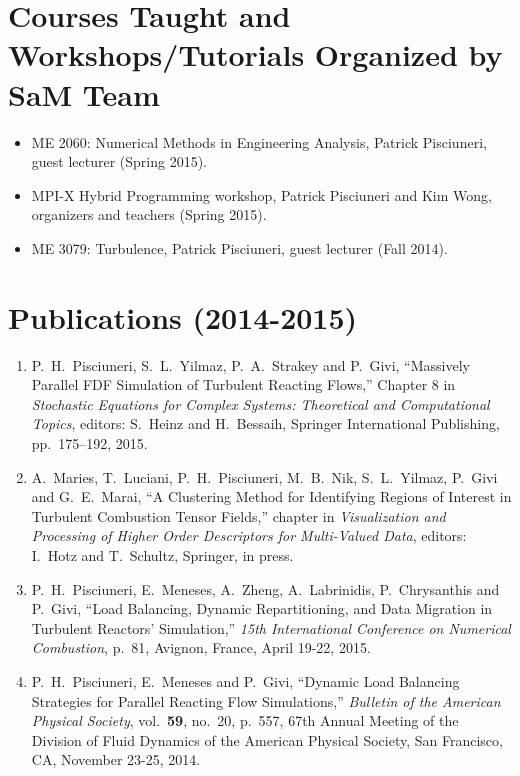 \documentclass{article}
\begin{document}
\section*{Courses Taught and Workshops/Tutorials Organized by SaM Team}
\begin{itemize}
\item ME 2060: Numerical Methods in Engineering Analysis, Patrick Pisciuneri, guest lecturer (Spring 2015).
\item MPI-X Hybrid Programming workshop, Patrick Pisciuneri and Kim Wong, organizers and teachers (Spring 2015).
\item ME 3079: Turbulence, Patrick Pisciuneri, guest lecturer (Fall 2014).
\end{itemize}
\section*{Publications (2014-2015)}
\begin{enumerate}
\item P.\ H.\ Pisciuneri, S.\ L.\ Yilmaz, P.\ A.\ Strakey and P.\ Givi, ``Massively Parallel FDF Simulation of Turbulent Reacting Flows,'' Chapter 8 in \textit{Stochastic Equations for Complex Systems: Theoretical and Computational Topics}, editors: S.\ Heinz and H.\ Bessaih, Springer International Publishing, pp.\ 175--192, 2015.
\item A.\ Maries, T.\ Luciani, P.\ H.\ Pisciuneri, M.\ B.\ Nik, S.\ L.\ Yilmaz, P.\ Givi and G.\ E.\ Marai, ``A Clustering Method for Identifying Regions of Interest in Turbulent Combustion Tensor Fields,'' chapter in \textit{Visualization and Processing of Higher Order Descriptors for Multi-Valued Data}, editors: I.\ Hotz and T.\ Schultz, Springer, in press.
\item P.\ H.\ Pisciuneri, E.\ Meneses, A.\ Zheng, A.\ Labrinidis, P.\ Chrysanthis and P.\ Givi, ``Load Balancing, Dynamic Repartitioning, and Data Migration in Turbulent Reactors' Simulation,'' \textit{15th International Conference on Numerical Combustion}, p.\ 81, Avignon, France, April 19-22, 2015.
\item P.\ H.\ Pisciuneri, E.\ Meneses and P.\ Givi, ``Dynamic Load Balancing Strategies for Parallel Reacting Flow Simulations,'' \textit{Bulletin of the American Physical Society}, vol.\ \textbf{59}, no.\ 20, p.\ 557, 67th Annual Meeting of the Division of Fluid Dynamics of the American Physical Society, San Francisco, CA, November 23-25, 2014.
\end{enumerate}
\end{document}
